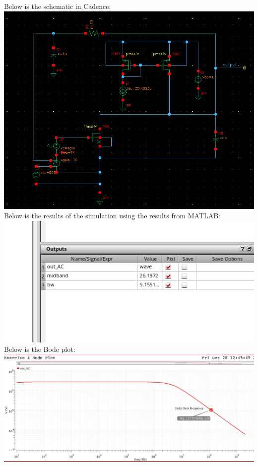 \documentclass[12pt, fleqn]{article}
\begin{document}
Below is the schematic in Cadence:\\[0.25cm]
\includegraphics[scale=0.325, center]{schem4.PNG}\\[0.25cm]
\newpage
Below is the results of the simulation using the results from MATLAB:\\[0.25cm]
\includegraphics[scale=0.475, center]{sim_res5.PNG}\\[0.25cm]
Below is the Bode plot:\\[0.25cm]
\includegraphics[scale=0.275, center]{bode5.PNG}\\[0.25cm]
\end{document}
